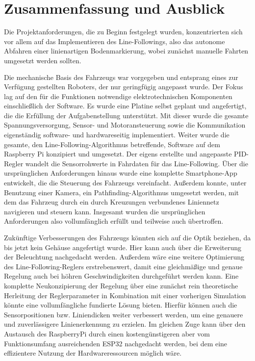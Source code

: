 \documentclass[12pt, a4paper]{report}
\begin{document}
\chapter{Zusammenfassung und Ausblick}
Die Projektanforderungen, die zu Beginn festgelegt wurden, konzentrierten sich vor allem auf das Implementieren des Line-Followings, also das autonome Abfahren einer linienartigen Bodenmarkierung, wobei zunächst manuelle Fahrten umgesetzt werden sollten.

Die mechanische Basis des Fahrzeugs war vorgegeben und entsprang eines zur Verfügung gestellten Roboters, der nur geringfügig angepasst wurde. Der Fokus lag auf den für die Funktionen notwendige elektrotechnischen Komponenten einschließlich der Software. Es wurde eine Platine selbst geplant und angefertigt, die die Erfüllung der Aufgabenstellung unterstützt. Mit dieser wurde die gesamte Spannungsversorgung, Sensor- und Motoransteuerung sowie die Kommunikation eigenständig software- und hardwareseitig implementiert. Weiter wurde die gesamte, den Line-Following-Algorithmus betreffende, Software auf dem Raspberry Pi konzipiert und umgesetzt. Der eigens erstellte und angepasste PID-Regler wandelt die Sensorrohwerte in Fahrdaten für das Line-Following. Über die ursprünglichen Anforderungen hinaus wurde eine komplette Smartphone-App entwickelt, die die Steuerung des Fahrzeugs vereinfacht. Außerdem konnte, unter Benutzung einer Kamera, ein Pathfinding-Algorithmus umgesetzt werden, mit dem das Fahrzeug durch ein durch Kreuzungen verbundenes Liniennetz navigieren und steuern kann. Insgesamt wurden die ursprünglichen Anforderungen also vollumfänglich erfüllt und teilweise auch übertroffen.

Zukünftige Verbesserungen des Fahrzeugs könnten sich auf die Optik beziehen, da bis jetzt kein Gehäuse angefertigt wurde. Hier kann auch über die Erweiterung der Beleuchtung nachgedacht werden. Außerdem wäre eine weitere Optimierung des Line-Following-Reglers erstrebenswert, damit eine gleichmäßige und genaue Regelung auch bei höhren Geschwindigkeiten durchgeführt werden kann. Eine komplette Neukonzipierung der Regelung über eine zunächst rein theoretische Herleitung der Reglerparameter in Kombination mit einer vorherigen Simulation könnte eine vollumfängliche fundierte Lösung bieten. Hierfür können auch die Sensorpositionen bzw. Liniendicken weiter verbessert werden, um eine genauere und zuverlässigere Linienerkennung zu erzielen. Im gleichen Zuge kann über den Austausch des RaspberryPi durch einen kostengünstigeren aber vom Funktionsumfang ausreichenden ESP32 nachgedacht werden, bei dem eine effizientere Nutzung der Hardwareressourcen möglich wäre.


\end{document}
